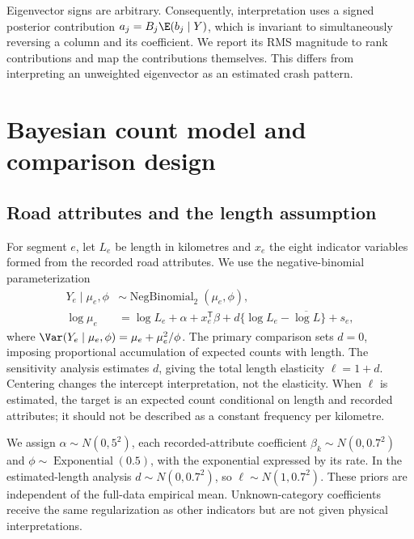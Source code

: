 \documentclass[11pt]{article}
\begin{document}
Eigenvector signs are arbitrary. Consequently, interpretation uses a signed posterior contribution $a_j=B_j\E(b_j\mid Y)$, which is invariant to simultaneously reversing a column and its coefficient. We report its RMS magnitude to rank contributions and map the contributions themselves. This differs from interpreting an unweighted eigenvector as an estimated crash pattern.

\FloatBarrier
\section{Bayesian count model and comparison design}
\subsection{Road attributes and the length assumption}
For segment $e$, let $L_e$ be length in kilometres and $x_e$ the eight indicator variables formed from the recorded road attributes. We use the negative-binomial parameterization
\begin{align}
 Y_e\mid\mu_e,\phi&\sim\operatorname{NegBinomial}_2(\mu_e,\phi),\\
 \log\mu_e&=\log L_e+\alpha+x_e^{\mathsf T}\beta
      +d\{\log L_e-\overline{\log L}\}+s_e,
 \label{eq:count}
\end{align}
where $\Var(Y_e\mid\mu_e,\phi)=\mu_e+\mu_e^2/\phi$. The primary comparison sets $d=0$, imposing proportional accumulation of expected counts with length. The sensitivity analysis estimates $d$, giving the total length elasticity $\ell=1+d$. Centering changes the intercept interpretation, not the elasticity. When $\ell$ is estimated, the target is an expected count conditional on length and recorded attributes; it should not be described as a constant frequency per kilometre.

We assign $\alpha\sim N(0,5^2)$, each recorded-attribute coefficient $\beta_k\sim N(0,0.7^2)$ and $\phi\sim\operatorname{Exponential}(0.5)$, with the exponential expressed by its rate. In the estimated-length analysis $d\sim N(0,0.7^2)$, so $\ell\sim N(1,0.7^2)$. These priors are independent of the full-data empirical mean. Unknown-category coefficients receive the same regularization as other indicators but are not given physical interpretations.
\end{document}
